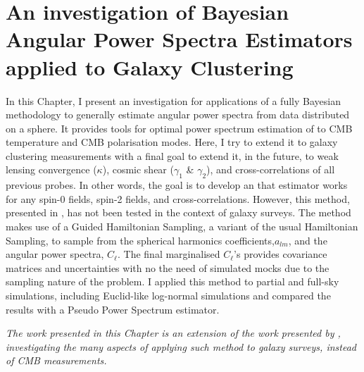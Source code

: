 %
\chapter[An investigation of Bayesian-$C_{\ell}$ Estimators applied to Galaxy Clustering]{An investigation of Bayesian Angular Power Spectra Estimators applied to Galaxy Clustering}\label{Chap:BPL}


\vspace*{\fill}

In this Chapter, I present an investigation for applications of a fully Bayesian methodology to generally estimate angular power spectra from data distributed on a sphere. It provides tools for optimal power spectrum estimation of to CMB temperature and CMB polarisation modes. Here, I try to extend it to galaxy clustering measurements with a final goal to extend it, in the future, to weak lensing convergence ($\kappa$), cosmic shear ($\gamma_1$ \& $\gamma_2$), and cross-correlations of all previous probes. In other words, the goal is to develop an that estimator works for any spin-0 fields, spin-2 fields, and cross-correlations. However, this method, presented in \cite{SreeThesis}, has not been tested in the context of galaxy surveys. The method makes use of a Guided Hamiltonian Sampling, a variant of the usual Hamiltonian Sampling, to sample from the spherical harmonics coefficients,$a_{lm}$, and the angular power spectra, $C_{\ell}$. The final marginalised $C_{\ell}$'s provides covariance matrices and uncertainties with no the need of simulated mocks due to the sampling nature of the problem. I applied this method to partial and full-sky simulations, including Euclid-like log-normal simulations and compared the results with a Pseudo Power Spectrum estimator.

\textit{The work presented in this Chapter is an extension of the work presented by \cite{SreeThesis}, investigating the many aspects of applying such method to galaxy surveys, instead of CMB measurements.}

\newpage

